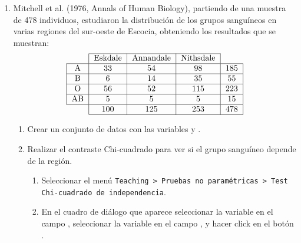 \begin{enumerate}[leftmargin=*]
\item Mitchell et al. (1976, Annals of Human Biology), partiendo de una muestra de 478 individuos, estudiaron la
distribución de los grupos sanguíneos en varias regiones del sur-oeste de Escocia, obteniendo los resultados que se
muestran:
\[
\begin{tabular}{|l|l|l|l|l|}
\cline{2-4}
\multicolumn{1}{c|}{} & \multicolumn{1}{c|}{Eskdale} & \multicolumn{1}{c|}{Annandale} & \multicolumn{1}{c|}{Nithsdale} & \multicolumn{1}{c}{} \\
\hline
\multicolumn{1}{|c|}{A} & \multicolumn{1}{c|}{33} & \multicolumn{1}{c|}{54} & \multicolumn{1}{c|}{98} & \multicolumn{1}{c|}{185} \\
\hline
\multicolumn{1}{|c|}{B} & \multicolumn{1}{c|}{6} & \multicolumn{1}{c|}{14} & \multicolumn{1}{c|}{35} & \multicolumn{1}{c|}{55} \\
\hline
\multicolumn{1}{|c|}{O} & \multicolumn{1}{c|}{56} & \multicolumn{1}{c|}{52} & \multicolumn{1}{c|}{115} & \multicolumn{1}{c|}{223} \\
\hline
\multicolumn{1}{|c|}{AB} & \multicolumn{1}{c|}{5} & \multicolumn{1}{c|}{5} & \multicolumn{1}{c|}{5} & \multicolumn{1}{c|}{15} \\
\hline
\multicolumn{1}{c|}{} & \multicolumn{1}{c|}{100} & \multicolumn{1}{c|}{125} & \multicolumn{1}{c|}{253} & \multicolumn{1}{c|}{478} \\
\cline{2-5}
\end{tabular}
\]

\begin{enumerate}
\item Crear un conjunto de datos con las variables  y .

\item Realizar el contraste Chi-cuadrado para ver si el grupo sanguíneo depende de la región.  
\begin{indicacion}
\begin{enumerate}
\item Seleccionar el menú \texttt{Teaching > Pruebas no paramétricas > Test Chi-cuadrado de independencia}.
\item En el cuadro de diálogo que aparece seleccionar la variable  en el campo
, seleccionar la variable  en el campo , y hacer click en el botón .
\end{enumerate}
\end{indicacion}


\end{enumerate}
\end{enumerate}
